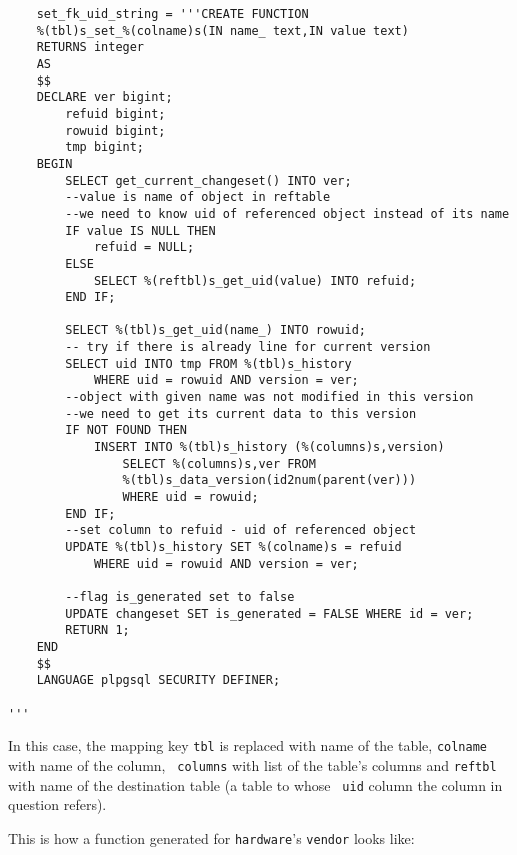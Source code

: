 \documentclass[deska]{subfiles}
\begin{document}
\begin{verbatim}
    set_fk_uid_string = '''CREATE FUNCTION
    %(tbl)s_set_%(colname)s(IN name_ text,IN value text)
    RETURNS integer
    AS
    $$
    DECLARE ver bigint;
        refuid bigint;
        rowuid bigint;
        tmp bigint;
    BEGIN
        SELECT get_current_changeset() INTO ver;
        --value is name of object in reftable
        --we need to know uid of referenced object instead of its name
        IF value IS NULL THEN
            refuid = NULL;
        ELSE
            SELECT %(reftbl)s_get_uid(value) INTO refuid;
        END IF;

        SELECT %(tbl)s_get_uid(name_) INTO rowuid;
        -- try if there is already line for current version
        SELECT uid INTO tmp FROM %(tbl)s_history
            WHERE uid = rowuid AND version = ver;
        --object with given name was not modified in this version
        --we need to get its current data to this version
        IF NOT FOUND THEN
            INSERT INTO %(tbl)s_history (%(columns)s,version)
                SELECT %(columns)s,ver FROM 
                %(tbl)s_data_version(id2num(parent(ver)))
                WHERE uid = rowuid;
        END IF;
        --set column to refuid - uid of referenced object
        UPDATE %(tbl)s_history SET %(colname)s = refuid
            WHERE uid = rowuid AND version = ver;

        --flag is_generated set to false
        UPDATE changeset SET is_generated = FALSE WHERE id = ver;
        RETURN 1;
    END
    $$
    LANGUAGE plpgsql SECURITY DEFINER;

'''
\end{verbatim}

In this case, the mapping key {\tt tbl} is replaced with name of the table, {\tt colname} with name of the column, {\tt
columns} with list of the table's columns and {\tt reftbl} with name of the destination table (a table to whose {\tt
uid} column the column in question refers).

This is how a function generated for {\tt hardware}'s {\tt vendor} looks like:
\end{document}
